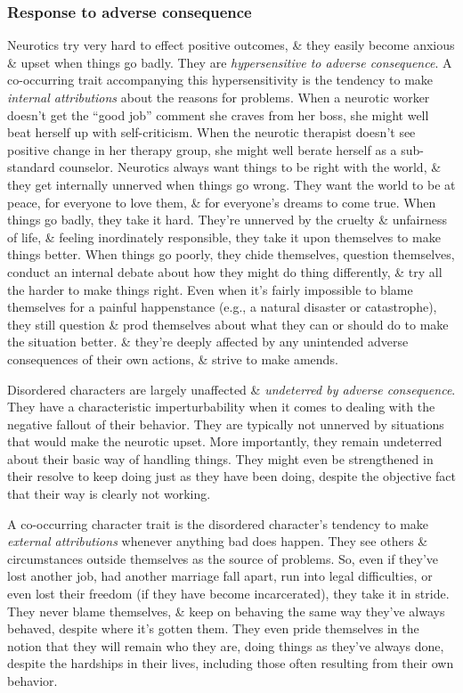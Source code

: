 \documentclass{article}
\numberwithin{equation}{section}
\begin{document}
\subsubsection{Response to adverse consequence}
Neurotics try very hard to effect positive outcomes, \& they easily become anxious \& upset when things go badly. They are \textit{hypersensitive to adverse consequence}. A co-occurring trait accompanying this hypersensitivity is the tendency to make \textit{internal attributions} about the reasons for problems. When a neurotic worker doesn't get the ``good job'' comment she craves from her boss, she might well beat herself up with self-criticism. When the neurotic therapist doesn't see positive change in her therapy group, she might well berate herself as a sub-standard counselor. Neurotics always want things to be right with the world, \& they get internally unnerved when things go wrong. They want the world to be at peace, for everyone to love them, \& for everyone's dreams to come true. When things go badly, they take it hard. They're unnerved by the cruelty \& unfairness of life, \& feeling inordinately responsible, they take it upon themselves to make things better. When things go poorly, they chide themselves, question themselves, conduct an internal debate about how they might do thing differently, \& try all the harder to make things right. Even when it's fairly impossible to blame themselves for a painful happenstance (e.g., a natural disaster or catastrophe), they still question \& prod themselves about what they can or should do to make the situation better. \& they're deeply affected by any unintended adverse consequences of their own actions, \& strive to make amends.

Disordered characters are largely unaffected \& \textit{undeterred by adverse consequence}. They have a characteristic imperturbability when it comes to dealing with the negative fallout of their behavior. They are typically not unnerved by situations that would make the neurotic upset. More importantly, they remain undeterred about their basic way of handling things. They might even be strengthened in their resolve to keep doing just as they have been doing, despite the objective fact that their way is clearly not working.

A co-occurring character trait is the disordered character's tendency to make \textit{external attributions} whenever anything bad does happen. They see others \& circumstances outside themselves as the source of problems. So, even if they've lost another job, had another marriage fall apart, run into legal difficulties, or even lost their freedom (if they have become incarcerated), they take it in stride. They never blame themselves, \& keep on behaving the same way they've always behaved, despite where it's gotten them. They even pride themselves in the notion that they will remain who they are, doing things as they've always done, despite the hardships in their lives, including those often resulting from their own behavior.
\end{document}
